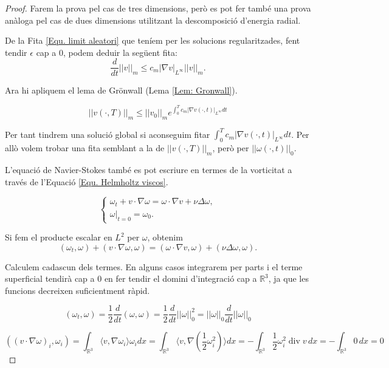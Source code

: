 \documentclass{article}
\numberwithin{equation}{section}
\DeclareMathOperator{\diver}{div}
\begin{document}
\begin{proof}
Farem la prova pel cas de tres dimensions, per\`{o} es pot fer tamb\'{e} una prova an\`{a}loga pel cas de dues dimensions utilitzant la descomposici\'{o} d'energia radial.

De la Fita \eqref{Equ. limit aleatori} que ten\'{i}em per les solucions regularitzades, fent tendir $\epsilon$ cap a $0$, podem deduir la seg\"{u}ent fita:
\[\frac{d}{dt}||v||_m\leq c_m|\nabla v|_{L^{\infty}}||v||_m.\]

Ara hi apliquem el lema de Gr\"{o}nwall (Lema \ref{Lem: Gronwall}).

\begin{equation}\label{Equ. limit velocitat Gronwall}
||v(\cdot,T)||_m\leq||v_0||_me^{\int_0^Tc_m|\nabla v(\cdot,t)|_{L^{\infty}}dt}
\end{equation}

Per tant tindrem una soluci\'{o} global si aconseguim fitar $\int_0^Tc_m|\nabla v(\cdot,t)|_{L^{\infty}}dt$. Per all\`{o} volem trobar una fita semblant a la de $||v(\cdot,T)||_m$, per\`{o} per $||\omega(\cdot,t)||_0$.

L'equaci\'{o} de Navier-Stokes tamb\'{e} es pot escriure en termes de la vorticitat a trav\'{e}s de l'Equaci\'{o} \eqref{Equ. Helmholtz viscos}.

\begin{equation}
\left\{\begin{array}{l}\omega_t+v\cdot\nabla\omega=\omega\cdot\nabla v+\nu\Delta\omega,\\\omega|_{t=0}=\omega_0.\end{array}\right.
\end{equation}

Si fem el producte escalar en $L^2$ per $\omega$, obtenim
\[(\omega_t,\omega)+(v\cdot\nabla\omega,\omega)=(\omega\cdot\nabla v,\omega)+(\nu\Delta\omega,\omega).\]

Calculem cadascun dels termes. En alguns casos integrarem per parts i el terme superficial tendir\`{a} cap a $0$ en fer tendir el domini d'integraci\'{o} cap a $\mathbb{R}^3$, ja que les funcions decreixen suficientment r\`{a}pid.

\[(\omega_t,\omega)=\frac{1}{2}\frac{d}{dt}(\omega,\omega)=\frac{1}{2}\frac{d}{dt}||\omega||_0^2=||\omega||_0\frac{d}{dt}||\omega||_0\]

\[((v\cdot\nabla\omega)_i,\omega_i)=\int_{\mathbb{R}^3}\langle v,\nabla\omega_i\rangle\omega_idx=\int_{\mathbb{R}^3}\langle v,\nabla\left(\frac{1}{2}\omega_i^2\right)\rangle dx=-\int_{\mathbb{R}^3}\frac{1}{2}\omega_i^2\diver v\,dx=-\int_{\mathbb{R}^3}0\,dx=0\]


\end{proof}
\end{document}
